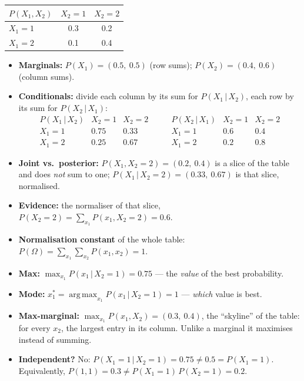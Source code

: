 \documentclass[11pt, oneside]{book}
\newcommand{\Prob}{\mathbb{P}}           %
\newcommand{\argmax}{\operatorname*{arg\,max}}
\newcommand{\given}{\,\vert\,}           %
\begin{document}
\begin{exbox}[title={Self-test with $X_1, X_2 \in \{1, 2\}$}]
\begin{center}
\small
\begin{tabular}{@{}lcc@{}}
\toprule
$P(X_1, X_2)$ & $X_2 = 1$ & $X_2 = 2$ \\
\midrule
$X_1 = 1$ & 0.3 & 0.2 \\
$X_1 = 2$ & 0.1 & 0.4 \\
\bottomrule
\end{tabular}
\end{center}
\begin{itemize}
  \item \textbf{Marginals:} $P(X_1) = (0.5,\ 0.5)$ (row sums);
    $P(X_2) = (0.4,\ 0.6)$ (column sums).
  \item \textbf{Conditionals:} divide each column by its sum for
    $P(X_1 \given X_2)$, each row by its sum for $P(X_2 \given X_1)$:
    \[
    \begin{array}{l|cc}
    P(X_1 \given X_2) & X_2 = 1 & X_2 = 2 \\ \hline
    X_1 = 1 & 0.75 & 0.33 \\
    X_1 = 2 & 0.25 & 0.67
    \end{array}
    \qquad
    \begin{array}{l|cc}
    P(X_2 \given X_1) & X_2 = 1 & X_2 = 2 \\ \hline
    X_1 = 1 & 0.6 & 0.4 \\
    X_1 = 2 & 0.2 & 0.8
    \end{array}
    \]
  \item \textbf{Joint vs.\ posterior:} $P(X_1, X_2 = 2) = (0.2,\ 0.4)$ is a
    slice of the table and does \emph{not} sum to one; $P(X_1 \given X_2 = 2)
    = (0.33,\ 0.67)$ is that slice, normalised.
  \item \textbf{Evidence:} the normaliser of that slice, $P(X_2 = 2) =
    \sum_{x_1} P(x_1, X_2 = 2) = 0.6$.
  \item \textbf{Normalisation constant} of the whole table:
    $P(\Omega) = \sum_{x_1}\sum_{x_2} P(x_1, x_2) = 1$.
  \item \textbf{Max:} $\max_{x_1} P(x_1 \given X_2 = 1) = 0.75$ --- the
    \emph{value} of the best probability.
  \item \textbf{Mode:} $x_1^* = \argmax_{x_1} P(x_1 \given X_2 = 1) = 1$ ---
    \emph{which} value is best.
  \item \textbf{Max-marginal:} $\max_{x_1} P(x_1, X_2) = (0.3,\ 0.4)$, the
    ``skyline'' of the table: for every $x_2$, the largest entry in its column.
    Unlike a marginal it maximises instead of summing.
  \item \textbf{Independent?} No: $P(X_1 = 1 \given X_2 = 1) = 0.75 \neq 0.5 =
    P(X_1 = 1)$. Equivalently, $P(1, 1) = 0.3 \neq P(X_1 = 1)\,P(X_2 = 1) =
    0.2$.
\end{itemize}
\end{exbox}
\end{document}
